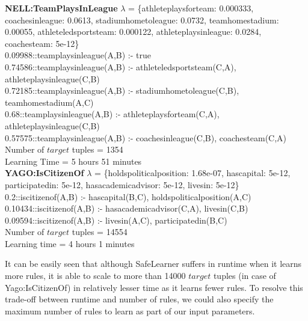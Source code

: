 \documentclass[akbc,twoside,11pt]{article}
\newcommand{\algorithmname}{SafeLearner\xspace}
\begin{document}
\begin{tiny}
\noindent \textbf{NELL:TeamPlaysInLeague} $\lambda$ = \{athleteplaysforteam: 0.000333, coachesinleague: 0.0613, stadiumhometoleague: 0.0732, teamhomestadium: 0.00055, athleteledsportsteam: 0.000122, athleteplaysinleague: 0.0284, coachesteam: 5e-12\} \\
0.09988::teamplaysinleague(A,B) :- true \\
0.74586::teamplaysinleague(A,B) :- athleteledsportsteam(C,A), athleteplaysinleague(C,B) \\
0.72185::teamplaysinleague(A,B) :- stadiumhometoleague(C,B), teamhomestadium(A,C) \\
0.68::teamplaysinleague(A,B) :- athleteplaysforteam(C,A), athleteplaysinleague(C,B) \\
0.57575::teamplaysinleague(A,B) :- coachesinleague(C,B), coachesteam(C,A) \\
Number of $target$ tuples = 1354 \\
Learning Time = 5 hours 51 minutes \\ %

\noindent \textbf{YAGO:IsCitizenOf} $\lambda$ = \{holdspoliticalposition: 1.68e-07, hascapital: 5e-12, participatedin: 5e-12, hasacademicadvisor: 5e-12, livesin: 5e-12\} \\
0.2::iscitizenof(A,B) :- hascapital(B,C), holdspoliticalposition(A,C) \\
0.10434::iscitizenof(A,B) :- hasacademicadvisor(C,A), livesin(C,B) \\
0.09594::iscitizenof(A,B) :- livesin(A,C), participatedin(B,C) \\
Number of $target$ tuples = 14554 \\
Learning time = 4 hours 1 minutes \\ %

\end{tiny}

\fi %

It can be easily seen that although \algorithmname suffers in runtime when it learns more rules, it is able to scale to more than 14000 $target$ tuples (in case of Yago:IsCitizenOf) in relatively lesser time as it learns fewer rules. To resolve this trade-off between runtime and number of rules, we could also specify the maximum number of rules to learn as part of our input parameters.
\end{document}

